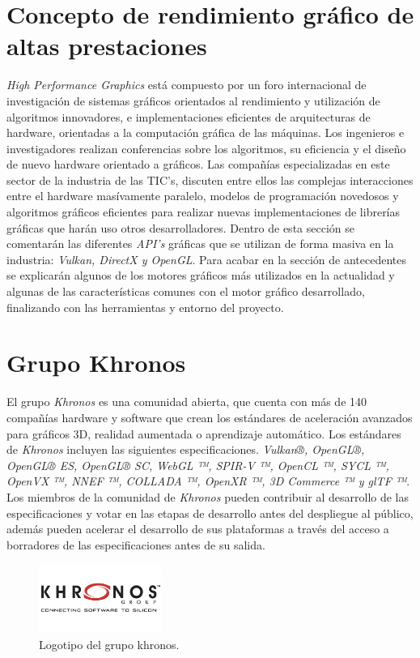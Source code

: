 \documentclass[a4paper]{book}
\begin{document}
\section{Concepto de rendimiento gráfico de altas prestaciones}
\label{sec:HPG}

\textit{High Performance Graphics} \cite{HPG:assoc} está compuesto por un foro internacional de investigación de sistemas gráficos
orientados al rendimiento y utilización de algoritmos innovadores, e implementaciones eficientes de arquitecturas
de hardware, orientadas a la computación gráfica de las máquinas. Los ingenieros e investigadores realizan conferencias
sobre los algoritmos, su eficiencia y el diseño de nuevo hardware orientado a gráficos. Las compañías especializadas
en este sector de la industria de las TIC’s, discuten entre ellos las complejas interacciones entre el hardware masívamente
paralelo, modelos de programación novedosos y algoritmos gráficos eficientes para realizar nuevas implementaciones de
librerías gráficas que harán uso otros desarrolladores. Dentro de esta sección se comentarán las diferentes \textit{API’s}
gráficas que se utilizan de forma masiva en la industria: \textit{Vulkan, DirectX y OpenGL}. Para acabar en la sección de
antecedentes se explicarán algunos de los motores gráficos más utilizados en la actualidad y algunas de las características
comunes con el motor gráfico desarrollado, finalizando con las herramientas y entorno del proyecto.

\section{Grupo Khronos}
\label{sec:Grupo Khronos}

El grupo \textit{Khronos} es una comunidad abierta, que cuenta con más de 140 compañías hardware y software que crean los estándares de
aceleración avanzados para gráficos 3D, realidad aumentada o aprendizaje automático. Los estándares de \textit{Khronos} incluyen las
siguientes especificaciones.  \textit{Vulkan®, OpenGL®, OpenGL® ES, OpenGL® SC, WebGL ™, \textit{SPIR-V} ™, OpenCL ™, SYCL ™, OpenVX ™,
NNEF ™, COLLADA ™, OpenXR ™, 3D Commerce ™ y glTF ™}. Los miembros de la comunidad de \textit{Khronos} pueden contribuir al desarrollo
de las especificaciones y votar en las etapas de desarrollo antes del despliegue al público, además pueden acelerar el desarrollo
de sus plataformas a través del acceso a borradores de las especificaciones antes de su salida.

\begin{figure}[H]
    \centering
    \includegraphics[width=4cm, keepaspectratio]{img/khronos.jpg}
    \caption{Logotipo del grupo khronos.}
    \label{khronos}
\end{figure}
\end{document}
